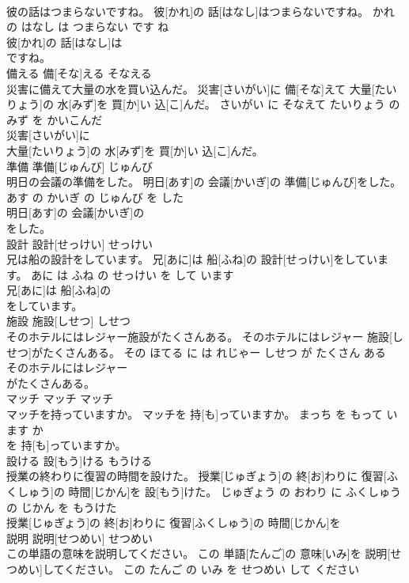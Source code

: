 \documentclass[8pt]{extreport}
\begin{document}
\begin{CJK}{UTF8}{min}
\\	彼の話はつまらないですね。	彼[かれ]の 話[はなし]はつまらないですね。	かれ の はなし は つまらない です ね	
\\	彼[かれ]の 話[はなし]は
\\	ですね。			
\\	備える	備[そな]える	そなえる	
\\	災害に備えて大量の水を買い込んだ。	災害[さいがい]に 備[そな]えて 大量[たいりょう]の 水[みず]を 買[か]い 込[こ]んだ。	さいがい に そなえて たいりょう の みず を かいこんだ	
\\	災害[さいがい]に
\\	大量[たいりょう]の 水[みず]を 買[か]い 込[こ]んだ。			
\\	準備	準備[じゅんび]	じゅんび	
\\	明日の会議の準備をした。	明日[あす]の 会議[かいぎ]の 準備[じゅんび]をした。	あす の かいぎ の じゅんび を した	
\\	明日[あす]の 会議[かいぎ]の
\\	をした。			
\\	設計	設計[せっけい]	せっけい	
\\	兄は船の設計をしています。	兄[あに]は 船[ふね]の 設計[せっけい]をしています。	あに は ふね の せっけい を して います	
\\	兄[あに]は 船[ふね]の
\\	をしています。			
\\	施設	施設[しせつ]	しせつ	
\\	そのホテルにはレジャー施設がたくさんある。	そのホテルにはレジャー 施設[しせつ]がたくさんある。	その ほてる に は れじゃー しせつ が たくさん ある	
\\	そのホテルにはレジャー
\\	がたくさんある。			
\\	マッチ	マッチ	マッチ	
\\	マッチを持っていますか。	マッチを 持[も]っていますか。	まっち を もって います か	
\\	を 持[も]っていますか。			
\\	設ける	設[もう]ける	もうける	
\\	授業の終わりに復習の時間を設けた。	授業[じゅぎょう]の 終[お]わりに 復習[ふくしゅう]の 時間[じかん]を 設[もう]けた。	じゅぎょう の おわり に ふくしゅう の じかん を もうけた	
\\	授業[じゅぎょう]の 終[お]わりに 復習[ふくしゅう]の 時間[じかん]を
\\	説明	説明[せつめい]	せつめい	
\\	この単語の意味を説明してください。	この 単語[たんご]の 意味[いみ]を 説明[せつめい]してください。	この たんご の いみ を せつめい して ください	

\end{CJK}
\end{document}
